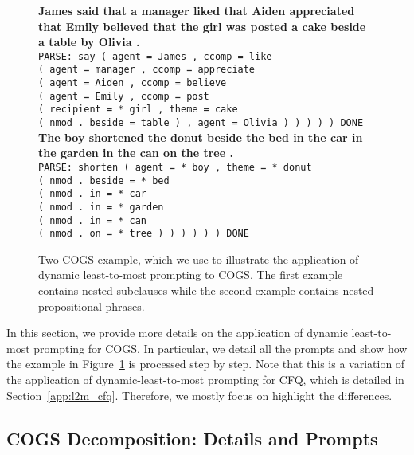 \documentclass{article} \usepackage{iclr2022_conference,times}
\begin{document}
\begin{figure}[h!]
\begin{flushleft}
\small{
    \textbf{James said that a manager liked that Aiden appreciated that Emily believed that the girl was posted a cake beside a table by Olivia .} \\
    \texttt{PARSE: say ( agent = James , ccomp = like \\
    \phantom{0000}( agent = manager , ccomp = appreciate \\
    \phantom{0000}( agent = Aiden , ccomp = believe \\
    \phantom{0000}( agent = Emily , ccomp = post \\
    \phantom{0000}( recipient = * girl , theme = cake \\
    \phantom{0000}( nmod . beside = table ) , agent = Olivia ) ) ) ) ) DONE}
    \vspace{4mm} \\
    \textbf{The boy shortened the donut beside the bed in the car in the garden in the can on the tree .}\\
    \texttt{PARSE: shorten ( agent = * boy , theme = * donut \\
    \phantom{0000}( nmod . beside = * bed \\
    \phantom{0000}( nmod . in = * car \\
    \phantom{0000}( nmod . in = * garden \\
    \phantom{0000}( nmod . in = * can \\
    \phantom{0000}( nmod . on = * tree ) ) ) ) ) ) DONE}
}
\end{flushleft}
    \caption{Two COGS example, which we use to illustrate the application of dynamic least-to-most prompting to COGS. The first example contains nested subclauses while the second example contains nested propositional phrases.}
    \label{fig:cogs_example_e2e}
\end{figure}

In this section, we provide more details on the application of dynamic least-to-most prompting for COGS. In particular, we detail all the prompts and show how the example in Figure~\ref{fig:cogs_example_e2e} is processed step by step. Note that this is a variation of the application of dynamic-least-to-most prompting for CFQ, which is detailed in Section~\ref{app:l2m_cfq}. Therefore, we mostly focus on highlight the differences.


\subsection{COGS Decomposition: Details and Prompts}
\label{app:cogs_decomposition}
\end{document}
